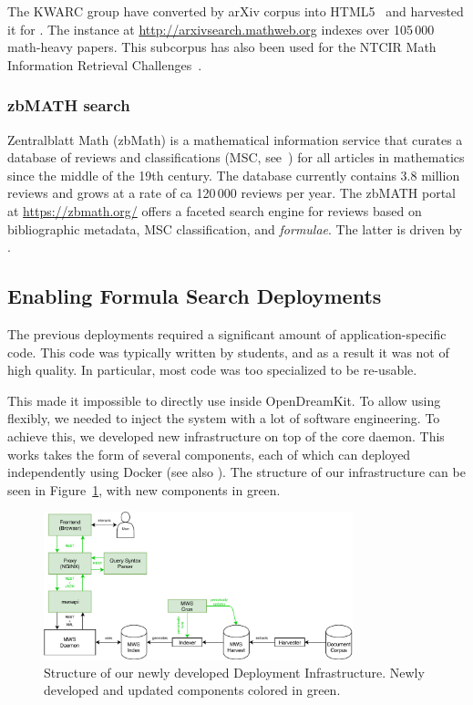 The KWARC group have converted by arXiv corpus into HTML5~\cite{StaKoh:tlcspx10} and harvested it for \MWS. The instance at \url{http://arxivsearch.mathweb.org}
indexes over 105\,000 math-heavy papers.
This subcorpus has also been used for the NTCIR Math Information Retrieval Challenges~\cite{AizKohOun:nmpto13,AizKohOunSch:nmto14,AizKohOunSch:nmto16}.

\subsubsection{zbMATH search}

Zentralblatt Math (zbMath) is a mathematical information service that curates a database of reviews and classifications (MSC, see~\cite{MSC2010}) for all articles in mathematics since the middle of the 19th century. The database currently contains 3.8 million reviews and grows at a rate of ca 120\,000 reviews per year.
The zbMATH portal at \url{https://zbmath.org/} offers a faceted search engine for reviews based on bibliographic metadata, MSC classification, and \emph{formulae}.
The latter is driven by \MWS. 

\subsection{Enabling Formula Search Deployments}\label{sec:software:deployment}

The previous \MWS deployments required a significant amount of application-specific code. 
This code was typically written by students, and as a result it was not of high quality. 
In particular, most code was too specialized to be re-usable. 

This made it impossible to directly use \MWS inside OpenDreamKit. 
To allow using \MWS flexibly, we needed to inject the system with a lot of software engineering. 
To achieve this, we developed new infrastructure on top of the core \MWS daemon. 
This works takes the form of several components, each of which can deployed independently using Docker (see also ).
The structure of our infrastructure can be seen in Figure~\ref{fig:mwsdeployment}, with new components in green. 

\begin{figure}[ht]
  \includegraphics[width=0.8\textwidth]{mws_layout.pdf}
  \caption{Structure of our newly developed \MWS Deployment Infrastructure. Newly developed and updated components colored in green. }\label{fig:mwsdeployment}
\end{figure}

